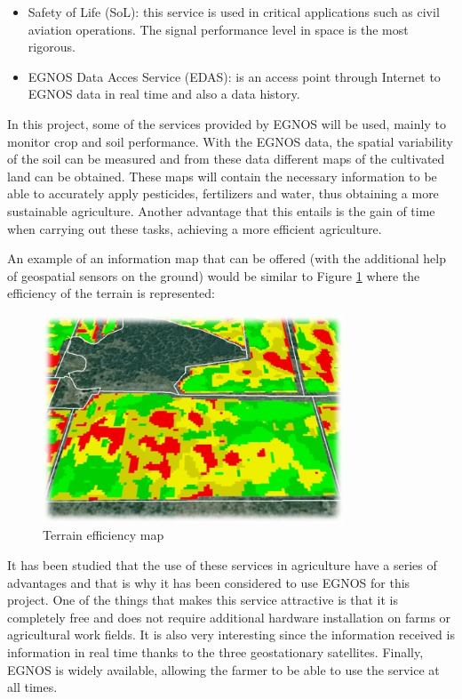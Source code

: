 \begin{itemize}
\begin{itemize}
        \item Safety of Life (SoL): this service is used in critical applications such as civil aviation operations. The signal performance level in space is the most rigorous.
        
        \item EGNOS Data Acces Service (EDAS): is an access point through Internet to EGNOS data in real time and also a data history.
        
    \end{itemize}

    In this project, some of the services provided by EGNOS will be used, mainly to monitor crop and soil performance. With the EGNOS data, the spatial variability of the soil can be measured and from these data different maps of the cultivated land can be obtained. These maps will contain the necessary information to be able to accurately apply pesticides, fertilizers and water, thus obtaining a more sustainable agriculture. Another advantage that this entails is the gain of time when carrying out these tasks, achieving a more efficient agriculture.

    An example of an information map that can be offered (with the additional help of geospatial sensors on the ground) would be similar to Figure \ref{fig:egnos} where the efficiency of the terrain is represented:
    
    \begin{figure}
        \centering
        \includegraphics[width=0.8\textwidth]{images/egnos.jpg}
        \caption{Terrain efficiency map}
        \label{fig:egnos}
    \end{figure} 
    
    It has been studied that the use of these services in agriculture have a series of advantages and that is why it has been considered to use EGNOS for this project. One of the things that makes this service attractive is that it is completely free and does not require additional hardware installation on farms or agricultural work fields. It is also very interesting since the information received is information in real time thanks to the three geostationary satellites. Finally, EGNOS is widely available, allowing the farmer to be able to use the service at all times.
    

\end{itemize}

